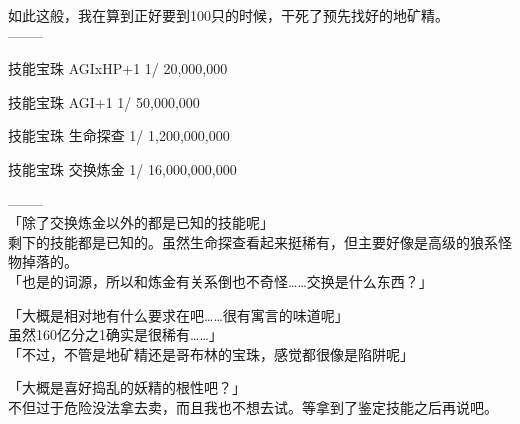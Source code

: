 如此这般，我在算到正好要到100只的时候，干死了预先找好的地矿精。\\

  --------

  技能宝珠  AGIxHP+1 1/     20,000,000

  技能宝珠     AGI+1 1/     50,000,000

  技能宝珠  生命探查 1/  1,200,000,000

  技能宝珠  交换炼金 1/ 16,000,000,000

  --------\\

「除了交换炼金以外的都是已知的技能呢」\\

剩下的技能都是已知的。虽然生命探查看起来挺稀有，但主要好像是高级的狼系怪物掉落的。\\

「也是的词源，所以和炼金有关系倒也不奇怪……交换是什么东西？」

「大概是相对地有什么要求在吧……很有寓言的味道呢」\\

虽然160亿分之1确实是很稀有……」\\

「不过，不管是地矿精还是哥布林的宝珠，感觉都很像是陷阱呢」

「大概是喜好捣乱的妖精的根性吧？」\\

不但过于危险没法拿去卖，而且我也不想去试。等拿到了鉴定技能之后再说吧。

